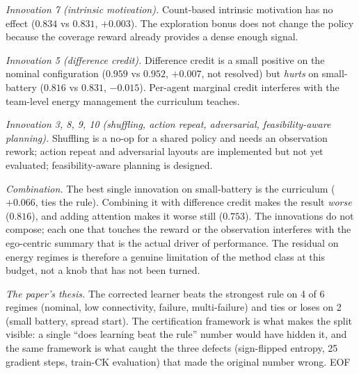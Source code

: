 \emph{Innovation 7 (intrinsic motivation).}
Count-based intrinsic motivation has no effect ($0.834$ vs $0.831$,
$+0.003$).  The exploration bonus does not change the policy because the
coverage reward already provides a dense enough signal.

\emph{Innovation 5 (difference credit).}
Difference credit is a small positive on the nominal configuration
($0.959$ vs $0.952$, $+0.007$, not resolved) but \emph{hurts} on
small-battery ($0.816$ vs $0.831$, $-0.015$).  Per-agent marginal credit
interferes with the team-level energy management the curriculum teaches.

\emph{Innovation 3, 8, 9, 10 (shuffling, action repeat, adversarial,
feasibility-aware planning).}  Shuffling is a no-op for a shared policy and
needs an observation rework; action repeat and adversarial layouts are
implemented but not yet evaluated; feasibility-aware planning is designed.

\emph{Combination.}  The best single innovation on small-battery is the
curriculum ($+0.066$, ties the rule).  Combining it with difference credit
makes the result \emph{worse} ($0.816$), and adding attention makes it
worse still ($0.753$).  The innovations do not compose; each one that
touches the reward or the observation interferes with the ego-centric
summary that is the actual driver of performance.  The residual on energy
regimes is therefore a genuine limitation of the method class at this
budget, not a knob that has not been turned.

\emph{The paper's thesis.}  The corrected learner beats the strongest rule
on 4 of 6 regimes (nominal, low connectivity, failure, multi-failure) and
ties or loses on 2 (small battery, spread start).  The certification
framework is what makes the split visible: a single ``does learning beat
the rule'' number would have hidden it, and the same framework is what
caught the three defects (sign-flipped entropy, 25 gradient steps,
train-CK evaluation) that made the original number wrong.
EOF